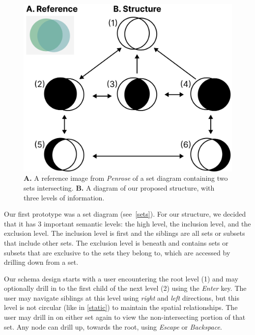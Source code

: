 \documentclass[journal]{vgtc}                %
\begin{document}
\begin{figure}[h]
  \centering
  \includegraphics[width=\linewidth]{figures/sets.png}
  \caption{\textbf{A.} A reference image from \textit{Penrose} of a set diagram containing two sets intersecting. \textbf{B.} A diagram of our proposed structure, with three levels of information.}
  \label{sets}
\end{figure}

Our first prototype was a set diagram (see~\autoref{sets}). For our structure, we decided that it has 3 important semantic levels: the high level, the inclusion level, and the exclusion level. The inclusion level is first and the siblings are all sets or subsets that include other sets. The exclusion level is beneath and contains sets or subsets that are exclusive to the sets they belong to, which are accessed by drilling down from a set. 

Our schema design starts with a user encountering the root level (1) and may optionally drill in to the first child of the next level (2) using the \textit{Enter} key. The user may navigate siblings at this level using \textit{right} and \textit{left} directions, but this level is not circular (like in \autoref{static}) to maintain the spatial relationships. The user may drill in on either set again to view the non-intersecting portion of that set. Any node can drill up, towards the root, using \textit{Escape} or \textit{Backspace}.
\end{document}

